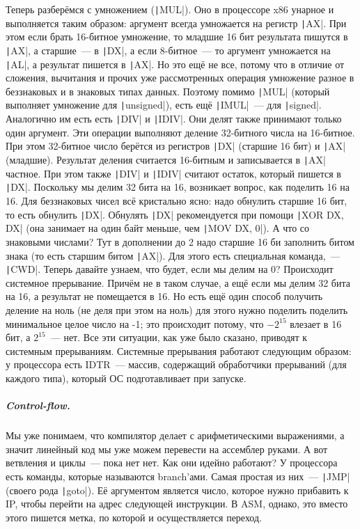 \documentclass{article}
\begin{document}
    Теперь разберёмся с умножением (\texttt|MUL|). Оно в процессоре x86 унарное и выполняется таким образом: аргумент всегда умножается на регистр \texttt|AX|. При этом если брать 16-битное умножение, то младшие 16 бит результата пишутся в \texttt|AX|, а старшие~--- в \texttt|DX|, а если 8-битное~--- то аргумент умножается на \texttt|AL|, а результат пишется в \texttt|AX|. Но это ещё не все, потому что в отличие от сложения, вычитания и прочих уже рассмотренных операция умножение разное в беззнаковых и в знаковых типах данных. Поэтому помимо \texttt|MUL| (который выполняет умножение для \texttt|unsigned|), есть ещё \texttt|IMUL|~--- для \texttt|signed|. Аналогично им есть есть \texttt|DIV| и \texttt|IDIV|. Они делят также принимают только один аргумент. Эти операции выполняют деление 32-битного числа на 16-битное. При этом 32-битное число берётся из регистров \texttt|DX| (старшие 16 бит) и \texttt|AX| (младшие). Результат деления считается 16-битным и записывается в \texttt|AX| частное. При этом также \texttt|DIV| и \texttt|IDIV| считают остаток, который пишется в \texttt|DX|. Поскольку мы делим 32 бита на 16, возникает вопрос, как поделить 16 на 16. Для беззнаковых чисел всё кристально ясно: надо обнулить старшие 16 бит, то есть обнулить \texttt|DX|. Обнулять \texttt|DX| рекомендуется при помощи \texttt|XOR DX, DX| (она занимает на один байт меньше, чем \texttt|MOV DX, 0|). А что со знаковыми числами? Тут в дополнении до 2 надо старшие 16 би заполнить битом знака (то есть старшим битом \texttt|AX|). Для этого есть специальная команда,~--- \texttt|CWD|. Теперь давайте узнаем, что будет, если мы делим на 0? Происходит системное прерывание. Причём не в таком случае, а ещё если мы делим 32 бита на 16, а результат не помещается в 16. Но есть ещё один способ получить деление на ноль (не деля при этом на ноль) для этого нужно поделить поделить минимальное целое число на -1; это происходит потому, что $-2^{15}$ влезает в 16 бит, а $2^{15}$~--- нет. Все эти ситуации, как уже было сказано, приводят к системным прерываниям. Системные прерывания работают следующим образом: у процессора есть IDTR~--- массив, содержащий обработчики прерываний (для каждого типа), который ОС подготавливает при запуске.
    \subparagraph{Control-flow.}
    Мы уже понимаем, что компилятор делает с арифметическими выражениями, а значит линейный код мы уже можем перевести на ассемблер руками. А вот ветвления и циклы~--- пока нет нет. Как они идейно работают? У процессора есть команды, которые называются branch'ами. Самая простая из них~--- \texttt|JMP| (своего рода \texttt|goto|). Её аргументом является число, которое нужно прибавить к IP, чтобы перейти на адрес следующей инструкции. В ASM, однако, это вместо этого пишется метка, по которой и осуществляется переход.\\
\end{document}

